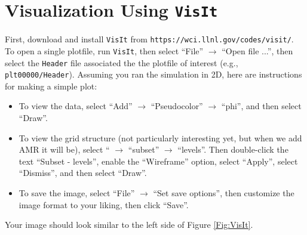 \section{Visualization Using {\tt VisIt}}\label{Sec:VisIt}
First, download and install {\tt VisIt} from {\tt https://wci.llnl.gov/codes/visit/}.
To open a single plotfile, run {\tt VisIt}, then select ``File'' $\rightarrow$ ``Open file ...'',
then select the {\tt Header} file associated the the plotfile of interest (e.g., {\tt plt00000/Header}).
Assuming you ran the simulation in 2D, here are instructions for making a simple plot:
\begin{itemize}
\item To view the data, select ``Add'' $\rightarrow$ ``Pseudocolor'' $\rightarrow$ ``phi'', and then select
``Draw''.
\item To view the grid structure (not particularly interesting yet, but when we add AMR it will be), select
`` $\rightarrow$ ``subset'' $\rightarrow$ ``levels''.  Then double-click the text ``Subset - levels'',
enable the ``Wireframe'' option, select ``Apply'', select ``Dismiss'', and then select ``Draw''.
\item To save the image, select ``File'' $\rightarrow$ ``Set save options'', then customize the image format
to your liking, then click ``Save''.
\end{itemize}
Your image should look similar to the left side of Figure \ref{Fig:VisIt}.\\
